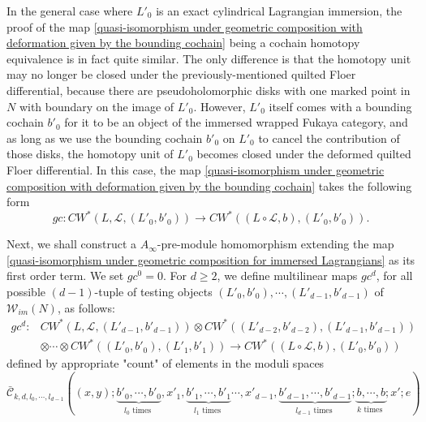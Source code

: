 \documentclass{amsart}
\numberwithin{equation}{section}
\numberwithin{figure}{section}
\begin{document}
	In the general case where $L'_{0}$ is an exact cylindrical Lagrangian immersion, the proof of the map \eqref{quasi-isomorphism under geometric composition with deformation given by the bounding cochain} being a cochain homotopy equivalence is in fact quite similar. The only difference is that the homotopy unit may no longer be closed under the previously-mentioned quilted Floer differential, because there are pseudoholomorphic disks with one marked point in $N$ with boundary on the image of $L'_{0}$. However, $L'_{0}$ itself comes with a bounding cochain $b'_{0}$ for it to be an object of the immersed wrapped Fukaya category, and as long as we use the bounding cochain $b'_{0}$ on $L'_{0}$ to cancel the contribution of those disks, the homotopy unit of $L'_{0}$ becomes closed under the deformed quilted Floer differential. In this case, the map \eqref{quasi-isomorphism under geometric composition with deformation given by the bounding cochain} takes the following form
\begin{equation}\label{quasi-isomorphism under geometric composition for immersed Lagrangians}
gc: CW^{*}(L, \mathcal{L}, (L'_{0}, b'_{0})) \to CW^{*}((L \circ \mathcal{L}, b), (L'_{0}, b'_{0})).
\end{equation} \par
	Next, we shall construct a $A_{\infty}$-pre-module homomorphism extending the map \eqref{quasi-isomorphism under geometric composition for immersed Lagrangians} as its first order term. We set $gc^{0} = 0$. For $d \ge 2$, we define multilinear maps $gc^{d}$, for all possible $(d-1)$-tuple of testing objects $(L'_{0}, b'_{0}), \cdots, (L'_{d-1}, b'_{d-1})$ of $\mathcal{W}_{im}(N)$, as follows:
\begin{equation}
\begin{split}
gc^{d}: & CW^{*}(L, \mathcal{L}, (L'_{d-1}, b'_{d-1})) \otimes CW^{*}((L'_{d-2}, b'_{d-2}), (L'_{d-1}, b'_{d-1}))\\
&\otimes \cdots \otimes CW^{*}((L'_{0}, b'_{0}), (L'_{1}, b'_{1}))
\to CW^{*}((L \circ \mathcal{L}, b), (L'_{0}, b'_{0}))
\end{split}
\end{equation}
defined by appropriate "count" of elements in the moduli spaces 
\begin{equation}\label{moduli space of quilted maps defining the higher order terms of the geometric composition map}
\bar{\mathcal{C}}_{k, d, l_{0}, \cdots, l_{d-1}}((x, y); \underbrace{b'_{0}, \cdots, b'_{0}}_{l_{0} \text{ times }}, x'_{1}, \underbrace{b'_{1}, \cdots, b'_{1}}_{l_{1} \text{ times }} \cdots, x'_{d-1}, \underbrace{b'_{d-1}, \cdots, b'_{d-1}}_{l_{d-1} \text{ times }}; \underbrace{b, \cdots, b}_{k \text{ times }}; x'; e)
\end{equation}
\end{document}
